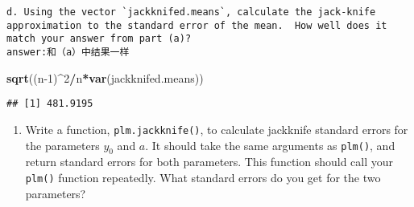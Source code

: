 \documentclass[
]{article}
\newenvironment{Shaded}{\begin{snugshade}}{\end{snugshade}}
\newcommand{\ControlFlowTok}[1]{\textcolor[rgb]{0.13,0.29,0.53}{\textbf{#1}}}
\newcommand{\DataTypeTok}[1]{\textcolor[rgb]{0.13,0.29,0.53}{#1}}
\newcommand{\DecValTok}[1]{\textcolor[rgb]{0.00,0.00,0.81}{#1}}
\newcommand{\KeywordTok}[1]{\textcolor[rgb]{0.13,0.29,0.53}{\textbf{#1}}}
\newcommand{\NormalTok}[1]{#1}
\newcommand{\OperatorTok}[1]{\textcolor[rgb]{0.81,0.36,0.00}{\textbf{#1}}}
\providecommand{\tightlist}{%
  \setlength{\itemsep}{0pt}\setlength{\parskip}{0pt}}
\begin{document}
\begin{verbatim}
d. Using the vector `jackknifed.means`, calculate the jack-knife approximation to the standard error of the mean.  How well does it match your answer from part (a)?
answer:和（a）中结果一样
\end{verbatim}

\begin{Shaded}
\begin{Highlighting}[]
\KeywordTok{sqrt}\NormalTok{((n}\DecValTok{-1}\NormalTok{)}\OperatorTok{^}\DecValTok{2}\OperatorTok{/}\NormalTok{n}\OperatorTok{*}\KeywordTok{var}\NormalTok{(jackknifed.means))}
\end{Highlighting}
\end{Shaded}

\begin{verbatim}
## [1] 481.9195
\end{verbatim}

\begin{enumerate}
\def\labelenumi{\arabic{enumi}.}
\setcounter{enumi}{5}
\tightlist
\item
  Write a function, \texttt{plm.jackknife()}, to calculate jackknife
  standard errors for the parameters \(y_0\) and \(a\). It should take
  the same arguments as \texttt{plm()}, and return standard errors for
  both parameters. This function should call your \texttt{plm()}
  function repeatedly. What standard errors do you get for the two
  parameters?
\end{enumerate}

\begin{Shaded}
\end{Shaded}
\end{document}
